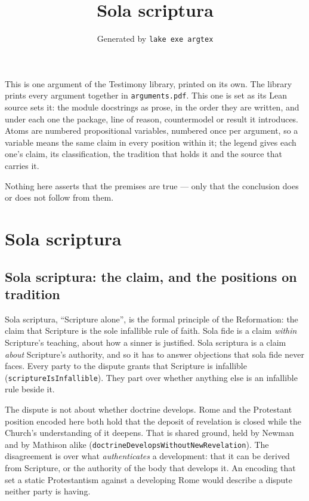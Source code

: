 \documentclass[11pt]{article}
\title{Sola scriptura}
\author{\credit{TestimonyArguments.SolaScriptura}}
\date{Generated by \texttt{lake exe argtex}}
\begin{document}
\maketitle
\noindent This is one argument of the Testimony library, printed on its own. The library prints every argument together in \texttt{arguments.pdf}. This one is set as its Lean source sets it: the module docstrings as prose, in the order they are written, and under each one the package, line of reason, countermodel or result it introduces. Atoms are numbered propositional variables, numbered once per argument, so a variable means the same claim in every position within it; the legend gives each one's claim, its classification, the tradition that holds it and the source that carries it.

\noindent Nothing here asserts that the premises are true --- only that the conclusion does or does not follow from them.

\tableofcontents
\clearpage
\section*{Sola scriptura}

\subsection*{Sola scriptura: the claim, and the positions on tradition}
Sola scriptura, “Scripture alone”, is the formal principle of the Reformation: the claim that Scripture is the sole infallible rule of faith. Sola fide is a claim \emph{within} Scripture’s teaching, about how a sinner is justified. Sola scriptura is a claim \emph{about} Scripture’s authority, and so it has to answer objections that sola fide never faces. Every party to the dispute grants that Scripture is infallible (\texttt{scripture\allowbreak{}Is\allowbreak{}Infallible}). They part over whether anything else is an infallible rule beside it.

The dispute is not about whether doctrine develops. Rome and the Protestant position encoded here both hold that the deposit of revelation is closed while the Church’s understanding of it deepens. That is shared ground, held by Newman and by Mathison alike (\texttt{doctrine\allowbreak{}Develops\allowbreak{}Without\allowbreak{}New\allowbreak{}Revelation}). The disagreement is over what \emph{authenticates} a development: that it can be derived from Scripture, or the authority of the body that develops it. An encoding that set a static Protestantism against a developing Rome would describe a dispute neither party is having.
\end{document}
